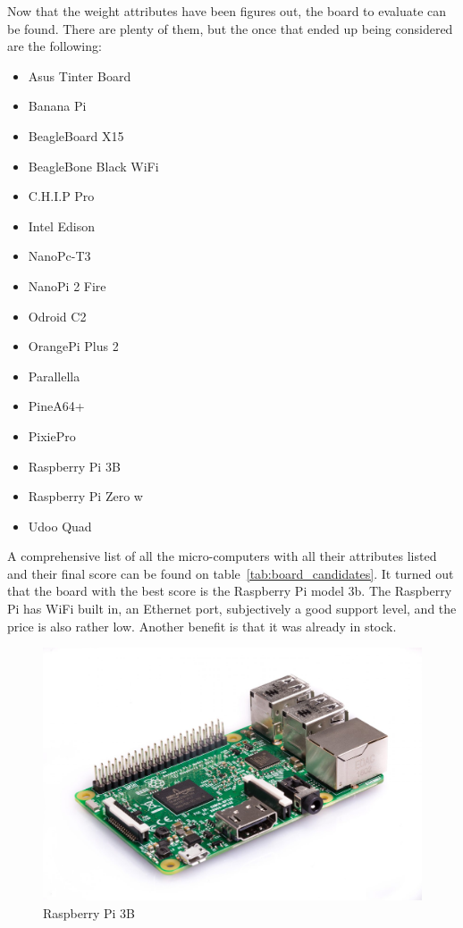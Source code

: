 Now that the weight attributes have been figures out, the board to evaluate can be found. There are plenty of them, but the once that ended up being considered are the following:
\begin{itemize}[itemsep=-1mm]
\item Asus Tinter Board \cite{asus-tinker-board}
\item Banana Pi \cite{banana-pi}
\item BeagleBoard X15 \cite{beagle-x15}
\item BeagleBone Black WiFi \cite{beagle-bone}
\item C.H.I.P Pro \cite{chip-pro}
\item Intel Edison \cite{intel-edison}
\item NanoPc-T3 \cite{nanopc}
\item NanoPi 2 Fire \cite{nanopi}
\item Odroid C2 \cite{odroid}
\item OrangePi Plus 2  \cite{orangepi}
\item Parallella \cite{parallella}
\item PineA64+ \cite{pinea64}
\item PixiePro \cite{pixiepro}
\item Raspberry Pi 3B \cite{rpi}
\item Raspberry Pi Zero w \cite{rpi}
\item Udoo Quad \cite{udoo-quad}
\end{itemize}

A comprehensive list of all the micro-computers with all their attributes listed and their final score can be found on table~\ref{tab:board_candidates}. It turned out that the board with the best score is the Raspberry Pi model 3b. The Raspberry Pi has WiFi built in, an Ethernet port, subjectively a good support level, and the price is also rather low. Another benefit is that it was already in stock.

\begin{figure} [h]
\centering
\includegraphics[width=0.7\linewidth]{Images/Design/rpi3b}
\caption{Raspberry Pi 3B}
\label{fig:rpi3b}
\end{figure}

